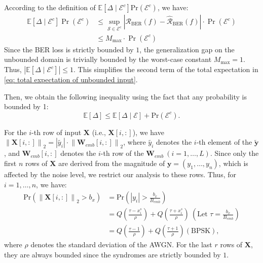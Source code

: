 \documentclass[lettersize,onecolumn]{IEEEtran}
\begin{document}
According to the definition of $\mathbb{E}\left[\Delta\mid \mathcal{E}^c\right] \mathrm{Pr}\left(\mathcal{E}^c\right)$, we have:
\begin{equation}
    \begin{aligned}
    \mathbb{E}\left[\Delta \mid \mathcal{E}^{c}\right] \operatorname{Pr}\left(\mathcal{E}^{c}\right) & \leq \sup _{\mathcal{S} \in \mathcal{E}^{c}}|\mathcal{R}_{\text{BER}}(f)-\hat{\mathcal{R}}_{\text{BER}}(f)| \cdot \operatorname{Pr}\left(\mathcal{E}^{c}\right) \\
    & \leq M_{\max } \cdot \operatorname{Pr}\left(\mathcal{E}^{c}\right)
\end{aligned}
\end{equation}
Since the BER loss is strictly bounded by $1$, the generalization gap on the unbounded domain is trivially bounded by the worst-case constant $ M_{\max } =1$. Thus, $\left|\mathbb{E}\left[\Delta \mid \mathcal{E}^{c}\right]\right|\leq 1$. This simplifies the second term of the total expectation in \eqref{eq: total expectation of unbounded input}.

Then, we obtain the following inequality using the fact that any probability is bounded by 1:
\begin{equation}
     \mathbb{E}\left[\Delta\right]\leq\mathbb{E}\left[\Delta\mid \mathcal{E}\right] +  \mathrm{Pr}\left(\mathcal{E}^c\right).
     \label{eq: total expectation of unbounded input, v2}
\end{equation}

For the $i$-th row of input $\mathbf{X}$ (i.e., $\mathbf{X}[i,:]$), we have $\left\|\mathbf{X}[i,:]\right\|_2=|\tilde{y_i}|\cdot \left\|\mathbf{W}_{emb}[i,:]\right\|_2$, where $\tilde{y_i}$ denotes the $i$-th element of the $\tilde{\mathbf{y}}$, and $\mathbf{W}_{emb}[i,:]$ denotes the $i$-th row of the $\mathbf{W}_{emb} \  (i=1,\ldots, L)$. Since only the first $n$ rows of $\mathbf{X}$ are derived from the magnitude of $\mathbf{y}=(y_1,\ldots,y_n)$, which is affected by the noise level, we restrict our analysis to these rows. Thus, for $i=1,\ldots, n$, we have:
\begin{equation}
    \begin{aligned}
    \mathrm{Pr}\left(\left\|\mathbf{X}[i,:]\right\|_{2}>b_{x}\right)&=\mathrm{Pr}\left(\left|y_{i}\right|>\frac{b_{x}}{B_{e m b}}\right) \\
    &= Q(\frac{\tau-x^s_i}{\rho}) + Q(\frac{\tau+x^s_i}{\rho}) \ (\text{Let } \tau=\frac{b_{x}}{B_{e m b}}) \\
    &=Q(\frac{\tau-1}{\rho}) + Q(\frac{\tau+1}{\rho}) (\text{BPSK}),
    \end{aligned}
\end{equation}
where $\rho$ denotes the standard deviation of the AWGN. For the last $r$ rows of $\mathbf{X}$, they are always bounded since the syndromes are strictly bounded by $1$.
\end{document}

